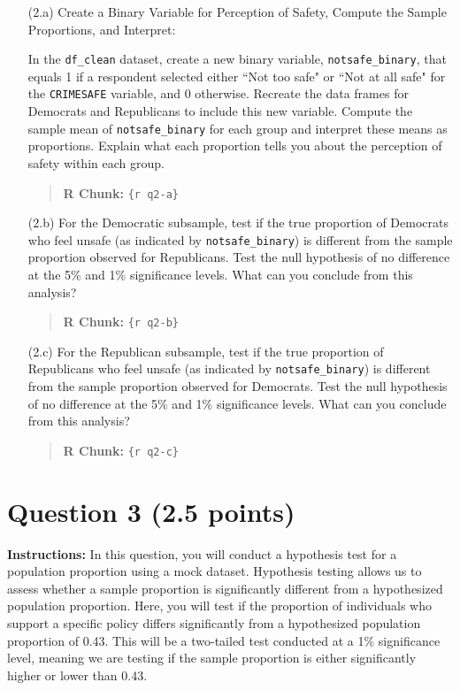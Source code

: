 \documentclass[11pt]{article}
\begin{document}
\begin{itemize}
    \item[(2.a)] Create a Binary Variable for Perception of Safety, Compute the Sample Proportions, and Interpret:

    In the \texttt{df\_clean} dataset, create a new binary variable, \texttt{notsafe\_binary}, that equals 1 if a respondent selected either ``Not too safe" or ``Not at all safe" for the \texttt{CRIMESAFE} variable, and 0 otherwise. Recreate the data frames for Democrats and Republicans to include this new variable. Compute the sample mean of \texttt{notsafe\_binary} for each group and interpret these means as proportions. Explain what each proportion tells you about the perception of safety within each group.
    \begin{quote}
    \textbf{R Chunk:} \texttt{\{r q2-a\}}
    \end{quote}

    \item[(2.b)] For the Democratic subsample, test if the true proportion of Democrats who feel unsafe (as indicated by \texttt{notsafe\_binary}) is different from the sample proportion observed for Republicans. Test the null hypothesis of no difference at the 5\% and 1\% significance levels. What can you conclude from this analysis?
    \begin{quote}
    \textbf{R Chunk:} \texttt{\{r q2-b\}}
    \end{quote}


    \item[(2.c)] For the Republican subsample, test if the true proportion of Republicans who feel unsafe (as indicated by \texttt{notsafe\_binary}) is different from the sample proportion observed for Democrats. Test the null hypothesis of no difference at the 5\% and 1\% significance levels. What can you conclude from this analysis?
    \begin{quote}
    \textbf{R Chunk:} \texttt{\{r q2-c\}}
    \end{quote}

\end{itemize}

\newpage
\section*{Question 3 (2.5 points)}

\textbf{Instructions:} In this question, you will conduct a hypothesis test for a population proportion using a mock dataset. Hypothesis testing allows us to assess whether a sample proportion is significantly different from a hypothesized population proportion. Here, you will test if the proportion of individuals who support a specific policy differs significantly from a hypothesized population proportion of 0.43. This will be a two-tailed test conducted at a 1\% significance level, meaning we are testing if the sample proportion is either significantly higher or lower than 0.43.
\end{document}
